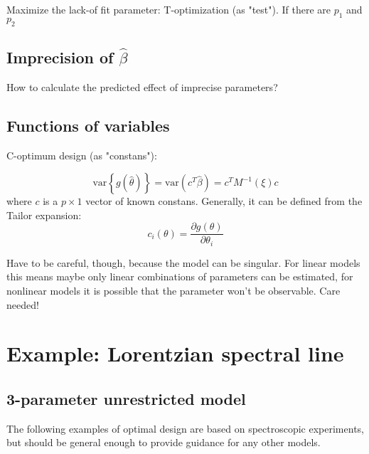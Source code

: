 \documentclass[12pt]{iopart}
\begin{document}
Maximize the lack-of fit parameter: T-optimization (as "test"). If there are $p_1$ and $p_2$ 

\subsection{Imprecision of $\hat \beta$}

How to calculate the predicted effect of imprecise parameters?

\subsection{Functions of variables}

C-optimum design (as "constans"):

\begin{equation}
\mathrm{var}\left\{g(\hat \theta)\right\} = \mathrm{var}(c^T \hat \beta) = c^T M^{-1}(\xi) c
\end{equation}
where $c$ is a $p \times 1$ vector of known constans. Generally, it can be defined from the Tailor expansion:
\begin{equation}
c_i(\theta) = \frac{\partial g(\theta)}{\partial \theta_i}
\end{equation}

Have to be careful, though, because the model can be singular. For linear models this means maybe only linear combinations of parameters can be estimated, for nonlinear models it is possible that the parameter won't be observable. Care needed!

\section{Example: Lorentzian spectral line}

\subsection{3-parameter unrestricted model}

The following examples of optimal design are based on spectroscopic experiments, but should be general enough to provide guidance for any other models.
\end{document}

